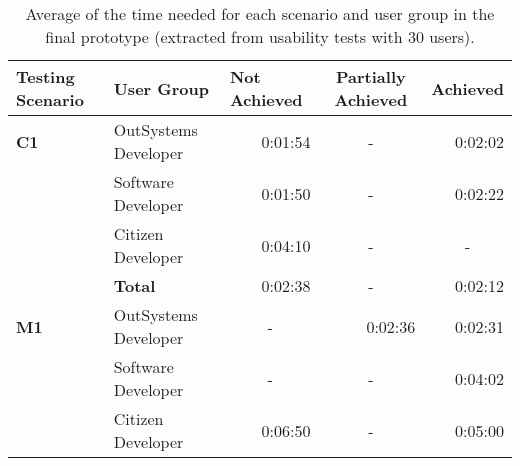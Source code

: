   \begin{table}[tb]
    \caption{Average of the time needed for each scenario and user group in the final prototype (extracted from usability tests with 30 users).}
      \label{tab:duration_final_prototype}
    \begin{tabular}{llrcr}
    \hline
    \rowcolor[HTML]{EFEFEF} 
    \textbf{Testing Scenario} & \textbf{User Group}  & \multicolumn{1}{l}{\cellcolor[HTML]{EFEFEF}\textbf{Not Achieved}} & \multicolumn{1}{C{2cm}}{\cellcolor[HTML]{EFEFEF}\textbf{Partially Achieved}} & \multicolumn{1}{l}{\cellcolor[HTML]{EFEFEF}\textbf{Achieved}} \\ \hline
    \textbf{C1}               & OutSystems Developer & 0:01:54                                                           & -                                                                       & 0:02:02                                                       \\
                              & Software Developer   & 0:01:50                                                           & -                                                                       & 0:02:22                                                       \\
                              & Citizen Developer    & 0:04:10                                                           & -                                                                       & \multicolumn{1}{c}{-}                                         \\
                              & \textbf{Total}       & 0:02:38                                                           & -                                                                       & 0:02:12                                                       \\ \hline
    \textbf{M1}               & OutSystems Developer & \multicolumn{1}{c}{-}                                             & \multicolumn{1}{r}{0:02:36}                                             & 0:02:31                                                       \\
                              & Software Developer   & \multicolumn{1}{c}{-}                                             & -                                                                       & 0:04:02                                                       \\
                              & Citizen Developer    & 0:06:50                                                           & -                                                                       & 0:05:00                                                       \\

\end{tabular}
\end{table}
